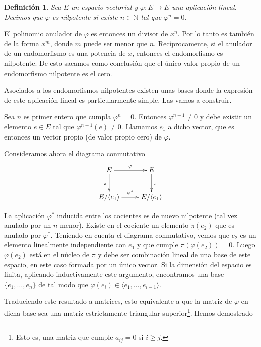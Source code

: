 \documentclass[a4paper,draft,12pt]{article}
\newtheorem{defi}{Definición}[section]%
\newcommand{\N}{\mathbb{N}}%
\newcommand{\df}[1]{\textsf{\color{blue}#1}}
\begin{document}
\begin{defi}

Sea $E$ un espacio vectorial y $\varphi : E \rightarrow E$ una aplicación lineal.  Decimos que $\varphi$ es  \df{nilpotente}   si existe $n \in \N$ tal que $\varphi^n=0$.

\end{defi}

El polinomio anulador de $\varphi$ es entonces un divisor de $x^n$.  Por lo tanto es también de la forma $x^m$, donde $m$ puede ser menor que $n$. Recíprocamente, si el anulador de un endomorfismo es una potencia de $x$, entonces el endomorfismo es nilpotente.  De esto sacamos como conclusión que el único  valor propio de un endomorfismo nilpotente es el cero.

Asociados a los endomorfismos nilpotentes existen unas bases donde la expresión de este aplicación lineal es particularmente simple.  Las vamos a construir.

Sea $n$ es primer entero que cumpla $\varphi^n=0$.  Entonces $\varphi^{n-1}\neq 0$ y debe existir un elemento $e\in E$ tal que $\varphi^{n-1}(e)\neq 0$.  Llamamos $e_1$ a dicho vector, que es entonces un vector propio (de valor propio cero) de $\varphi$.



Consideramos ahora el diagrama conmutativo
$$
\xymatrix{
E \ar[r]^\varphi\ar[d]_\pi& E \ar[d]^\pi\\
E/\langle e_1\rangle \ar[r]^{\varphi^*}& E /\langle e_1 \rangle
}
$$


La aplicación $\varphi^*$ inducida entre los cocientes es de nuevo nilpotente (tal vez anulado por un $n$  menor).  Existe en el cociente un elemento $\pi(e_2)$ que es anulado por $\varphi^*$.  Teniendo en cuenta el diagrama conmutativo, vemos que $e_2$ es un elemento linealmente independiente con $e_1$ y que cumple $\pi(\varphi(e_2))=0$.  Luego $\varphi(e_2)$ está en el núcleo de $\pi$ y debe ser combinación lineal de una base de este espacio, en este caso formada por un único vector. Si la dimensión del espacio es finita, aplicando inductivamente este argumento, encontramos una base $\{e_1, \dots, e_n\}$ de tal modo que $\varphi(e_i) \in \langle e_1, \dots, e_{i-1}\rangle$. 

Traduciendo este resultado a matrices, esto equivalente a que la matriz de $\varphi$ en dicha base sea una matriz estrictamente triangular superior\footnote{Esto es, una matriz que cumple $a_{ij}=0 $ si $ i \geq j$.}.  Hemos demostrado 
\end{document}
